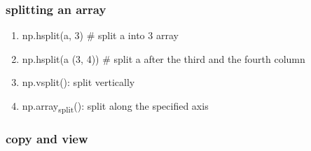 \documentclass[11pt]{article}
\begin{document}
\subsubsection{splitting an array}
\label{sec:org3379b04}
\begin{enumerate}
\item np.hsplit(a, 3) \# split a into 3 array
\label{sec:org9de2dbf}
\item np.hsplit(a (3, 4)) \# split a after the third and the fourth column
\label{sec:orgf28363f}
\item np.vsplit(): split vertically
\label{sec:org02bb859}
\item np.array\textsubscript{split}(): split along the specified axis
\label{sec:orgef78aec}
\end{enumerate}
\subsubsection{copy and view}
\label{sec:org72e1f73}
\end{document}
